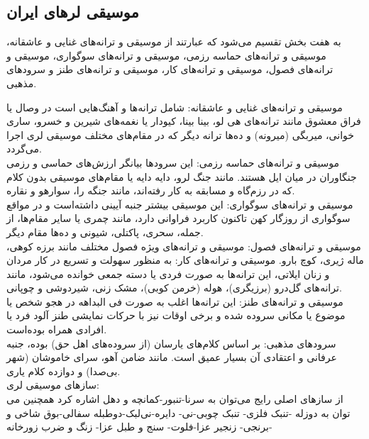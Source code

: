 \subsection{موسیقی لرهای ایران}
 به هفت بخش تقسیم می‌شود که عبارتند از موسیقی و ترانه‌های غنایی و عاشقانه، موسیقی و ترانه‌های حماسه رزمی، موسیقی و ترانه‌های سوگواری، موسیقی و ترانه‌های فصول، موسیقی و ترانه‌های کار، موسیقی و ترانه‌های طنز و سرودهای مذهبی.

موسیقی و ترانه‌های غنایی و عاشقانه: شامل ترانه‌ها و آهنگ‌هایی است در وصال یا فراق معشوق مانند ترانه‌های هی لو، بینا بینا، کیودار یا نغمه‌های شیرین و خسرو، ساری خوانی، میربگی (میرونه) و ده‌ها ترانه دیگر که در مقام‌های مختلف موسیقی لری اجرا می‌گردد.\\

موسیقی و ترانه‌های حماسه رزمی: این سرودها بیانگر ارزش‌های حماسی و رزمی جنگاوران در میان ایل هستند. مانند جنگ لرو، دایه دایه یا مقام‌های موسیقی بدون کلام که در رزم‌گاه و مسابقه به کار رفته‌اند، مانند جنگه را، سوارهو و نقاره.\\

موسیقی و ترانه‌های سوگواری: این موسیقی بیشتر جنبه آیینی داشته‌است و در مواقع سوگواری از روزگار کهن تاکنون کاربرد فراوانی دارد، مانند چمری یا سایر مقام‌ها، از جمله، سحری، پاکتلی، شیونی و ده‌ها مقام دیگر.\\

موسیقی و ترانه‌های فصول: موسیقی و ترانه‌های ویژه فصول مختلف مانند برزه کوهی، ماله ژیری، کوچ بارو.
موسیقی و ترانه‌های کار: به منظور سهولت و تسریع در کار مردان و زنان ایلاتی، این ترانه‌ها به صورت فردی یا دسته جمعی خوانده می‌شود، مانند ترانه‌های گل‌درو (برزیگری)، هوله (خرمن کوبی)، مشک زنی، شیردوشی و چوپانی.\\

موسیقی و ترانه‌های طنز: این ترانه‌ها اغلب به صورت فی البداهه در هجو شخص یا موضوع یا مکانی سروده شده و برخی اوقات نیز با حرکات نمایشی طنز آلود فرد یا افرادی همراه بوده‌است.
\\
سرودهای مذهبی: بر اساس کلام‌های یارسان (از سروده‌های اهل حق) بوده، جنبه عرفانی و اعتقادی آن بسیار عمیق است. مانند ضامن آهو، سرای خاموشان (شهر بی‌صدا) و دوازده کلام یاری.\\


سازهای موسیقی لری:\\

از سازهای اصلی رایج می‌توان به سرنا-تنبور-کمانچه و دهل اشاره کرد همچنین می توان به دوزله -تنبک فلزی- تنبک چوبی-نی- دایره-نی‌لبک-دوطبله سفالی-بوق شاخی و برنجی- زنجیر عزا-فلوت- سنج و طبل عزا- زنگ و ضرب زورخانه-

